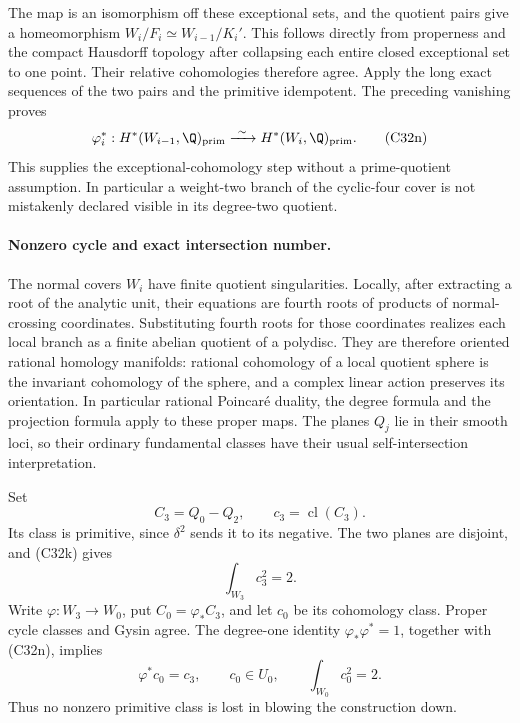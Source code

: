 The map is an isomorphism off these exceptional
sets, and the quotient pairs give a homeomorphism
$W_i/F_i\simeq W_{i-1}/K_i'$.  This follows
directly from properness and the compact
Hausdorff topology after collapsing each entire
closed exceptional set to one point.  Their
relative cohomologies therefore agree.  Apply
the long exact sequences of the two pairs and
the primitive idempotent.  The preceding
vanishing proves
\[
 \varphi_i^*:H^*(W_{i-1},\Q)_{\rm prim}
                    \xrightarrow{\ \sim\ }
                    H^*(W_i,\Q)_{\rm prim}.
                                                        \tag{C32n}
\]
This supplies the exceptional-cohomology step
without a prime-quotient assumption.  In
particular a weight-two branch of the
cyclic-four cover is not mistakenly declared
visible in its degree-two quotient.

\paragraph{Nonzero cycle and exact intersection number.}
The normal covers $W_i$ have finite quotient
singularities.  Locally, after extracting a
root of the analytic unit, their equations
are fourth roots of products of normal-crossing
coordinates.  Substituting fourth roots for
those coordinates realizes each local branch
as a finite abelian quotient of a polydisc.
They are therefore oriented rational homology
manifolds: rational cohomology of a local
quotient sphere is the invariant cohomology
of the sphere, and a complex linear action
preserves its orientation.  In particular
rational Poincar\'e duality, the degree formula
and the projection formula apply to these
proper maps.  The planes $Q_j$ lie in their
smooth loci, so their ordinary fundamental
classes have their usual self-intersection
interpretation.

Set
\[
              C_3=Q_0-Q_2,\qquad c_3=\operatorname{cl}(C_3).
\]
Its class is primitive, since $\delta^2$ sends
it to its negative.  The two planes are
disjoint, and (C32k) gives
\[
                         \int_{W_3}c_3^2=2.
                                                        \tag{C32o}
\]
Write $\varphi:W_3\to W_0$, put
$C_0=\varphi_*C_3$, and let $c_0$ be its
cohomology class.  Proper cycle classes and
Gysin agree.  The degree-one identity
$\varphi_*\varphi^*=1$, together with (C32n),
implies
\[
       \varphi^*c_0=c_3,\qquad
       c_0\in U_0,\qquad
                         \int_{W_0}c_0^2=2.
                                                        \tag{C32p}
\]
Thus no nonzero primitive class is lost in
blowing the construction down.

